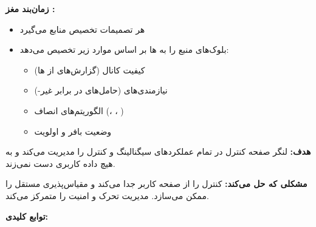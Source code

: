 \textbf{زمان‌بند  مغز :}

\begin{itemize}
\tightlist
\item
  هر  تصمیمات تخصیص منابع می‌گیرد
\item
  بلوک‌های منبع  را به ها بر اساس موارد زیر تخصیص می‌دهد:

  \begin{itemize}
  \tightlist
  \item
    کیفیت کانال (گزارش‌های  از ها)
  \item
    نیازمندی‌های  (حامل‌های  در برابر غیر-)
  \item
    الگوریتم‌های انصاف (، ، )
  \item
    وضعیت بافر و اولویت
  \end{itemize}
\end{itemize}


\textbf{هدف:} لنگر صفحه کنترل در   تمام عملکردهای سیگنالینگ و کنترل را مدیریت می‌کند و به هیچ داده کاربری دست نمی‌زند.


\textbf{مشکلی که حل می‌کند:} کنترل را از صفحه کاربر جدا می‌کند و مقیاس‌پذیری مستقل را ممکن می‌سازد. مدیریت تحرک و امنیت را متمرکز می‌کند.

\textbf{توابع کلیدی:}

